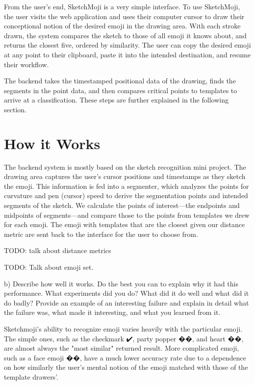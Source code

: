 \documentclass{article}
\begin{document}
From the user's end, SketchMoji is a very simple interface. To use SketchMoji, the user visits the web application and uses their computer cursor to draw their conceptional notion of the desired emoji in the drawing area. With each stroke drawn, the system compares the sketch to those of all emoji it knows about, and returns the closest five, ordered by similarity. The user can copy the desired emoji at any point to their clipboard, paste it into the intended destination, and resume their workflow.

The backend takes the timestamped positional data of the drawing, finds the segments in the point data, and then compares critical points to templates to arrive at a classification. These steps are further explained in the following section.

\section{How it Works}

The backend system is mostly based on the sketch recognition mini project. The drawing area captures the user's cursor positions and timestamps as they sketch the emoji. This information is fed into a segmenter, which analyzes the points for curvature and pen (cursor) speed to derive the segmentation points and intended segments of the sketch. We calculate the points of interest—the endpoints and midpoints of segments—and compare those to the points from templates we drew for each emoji. The emoji with templates that are the closest given our distance metric are sent back to the interface for the user to choose from.

TODO: talk about distance metrics

TODO: Talk about emoji set.

b) Describe how well it works. Do the best you can to explain why it had this performance. What experiments did you do? What did it do well and what did it do badly? Provide an example of an interesting failure and explain in detail what the failure was, what made it interesting, and what you learned from it.

Sketchmoji's ability to recognize emoji varies heavily with the particular emoji. The simple ones, such as the checkmark ✔️, party popper ��, and heart ��, are almost always the "most similar" returned result. More complicated emoji, such as a face emoji ��, have a much lower accuracy rate due to a dependence on how similarly the user's mental notion of the emoji matched with those of the template drawers'.
\end{document}

